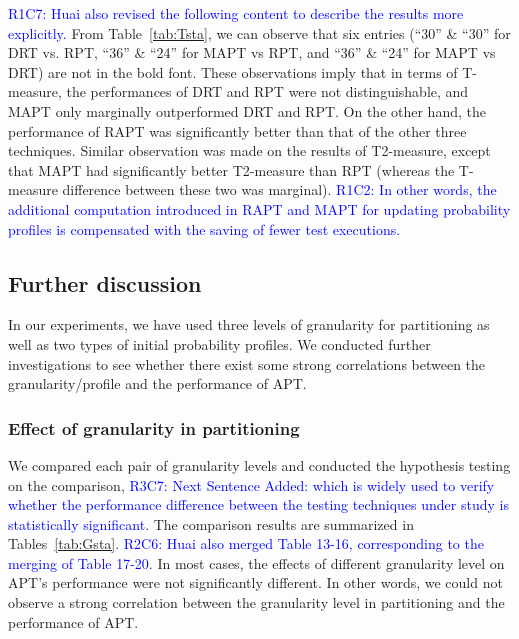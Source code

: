 \documentclass[10pt,journal,compsoc]{IEEEtran}
\begin{document}
\textcolor{blue}{R1C7: Huai also revised the following content to describe the results more explicitly.} From Table~\ref{tab:Tsta}, we can observe that six entries (``30'' \& ``30'' for DRT vs. RPT, ``36'' \& ``24'' for MAPT vs RPT, and ``36'' \& ``24'' for MAPT vs DRT) are not in the bold font. These observations imply that in terms of T-measure, the performances of DRT and RPT were not distinguishable, and MAPT only marginally outperformed DRT and RPT. On the other hand, the performance of RAPT was significantly better than that of the other three techniques. Similar observation was made on the results of T2-measure, except that MAPT had significantly better T2-measure than RPT (whereas the T-measure difference between these two was marginal). \textcolor{blue}{R1C2: In other words, the additional computation introduced in RAPT and MAPT for updating probability profiles is compensated with the saving of fewer test executions.}


\subsection{Further discussion}

In our experiments, we have used three levels of granularity for partitioning as well as two types of initial probability profiles. We conducted further investigations to see whether there exist some strong correlations between the granularity/profile and the performance of APT.

\subsubsection{Effect of granularity in partitioning}

We compared each pair of granularity levels and conducted the hypothesis testing on the comparison,  \textcolor{blue}{R3C7: Next Sentence Added: which is widely used to verify whether the performance difference between the testing techniques under study is statistically significant}. The comparison results are summarized in Tables~\ref{tab:Gsta}. \textcolor{blue}{R2C6: Huai also merged Table 13-16, corresponding to the merging of Table 17-20.} In most cases, the effects of different granularity level on APT's performance were not significantly different. In other words, we could not observe a strong correlation between the granularity level in partitioning and the performance of APT.
\end{document}
